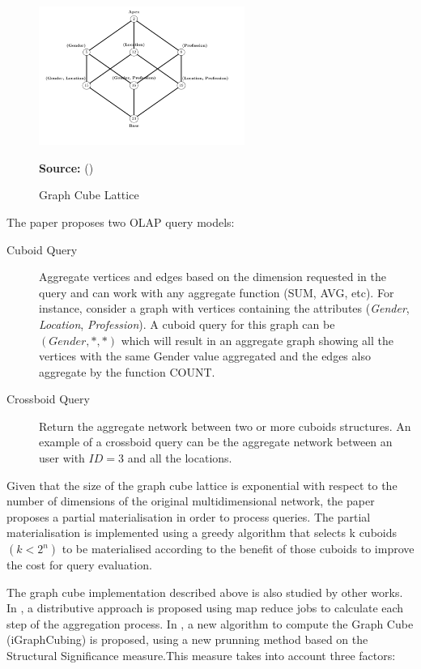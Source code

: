 \begin{figure}[ht]
\centering
\caption{Graph Cube Lattice}
\label{fig:figure14}
\includegraphics[width=0.6\textwidth]{images/graph_lattice.png}
\par\medskip\ABNTEXfontereduzida\selectfont\textbf{Source:} \citeauthor{Zhao2011} (\citeyear{Zhao2011}) \par\medskip
\end{figure}

The paper proposes two OLAP query models:
\begin{description}
\item[Cuboid Query] Aggregate vertices and edges based on the dimension requested in the query and can work with any aggregate function (SUM, AVG, etc). For instance, consider a graph with vertices containing the attributes (\emph{Gender}, \emph{Location}, \emph{Profession}). A cuboid query for this graph can be $(Gender, *, *)$ which will result in an aggregate graph showing all the vertices with the same Gender value aggregated and the edges also aggregate by the function COUNT.
\item[Crossboid Query] Return the aggregate network between two or more cuboids structures. An example of a crossboid query can be the aggregate network between an user with $ID = 3$ and all the locations.
\end{description}

Given that the size of the graph cube lattice is exponential with respect to the number of dimensions of the original multidimensional network, the paper proposes a partial materialisation in order to process queries. The partial materialisation is implemented using a greedy algorithm that selects k cuboids $(k < 2^n)$ to be materialised according to the benefit of those cuboids to improve the cost for query evaluation.

The graph cube implementation described above is also studied by other works. In \cite{Denis2013}, a distributive approach is proposed using map reduce jobs to calculate each step of the aggregation process. In \cite{Khan2014}, a new algorithm to compute the Graph Cube (iGraphCubing) is proposed, using a new prunning method based on the Structural Significance measure.This measure takes into account three factors:

